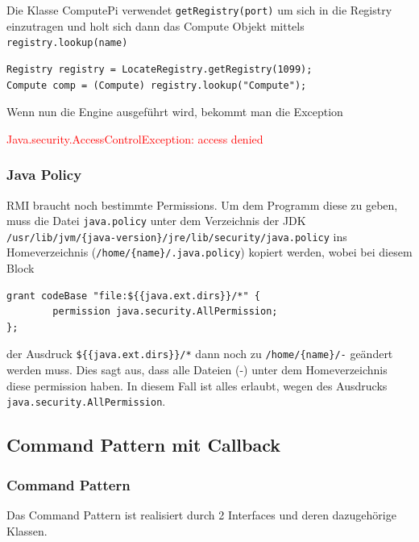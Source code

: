 Die Klasse ComputePi verwendet \texttt{getRegistry(port)} um sich in die Registry
einzutragen und holt sich dann das Compute Objekt mittels \texttt{registry.lookup(name)}

\begin{lstlisting}[style=Java, caption=Compute]
Registry registry = LocateRegistry.getRegistry(1099);
Compute comp = (Compute) registry.lookup("Compute");
\end{lstlisting}

Wenn nun die Engine ausgef\"uhrt wird, bekommt man die Exception

\textcolor{red}{Java.security.AccessControlException: access denied}

\clearpage

\subsubsection{Java Policy}

RMI braucht noch bestimmte Permissions. Um dem Programm diese zu geben, muss die Datei \texttt{java.policy} unter dem Verzeichnis der JDK \texttt{/usr/lib/jvm/\{java-version\}/jre/lib/security/java.policy} ins Homeverzeichnis (\texttt{/home/\{name\}/.java.policy}) kopiert werden, wobei bei diesem Block\\

\begin{lstlisting}[caption=java.policy]
grant codeBase "file:${{java.ext.dirs}}/*" {
        permission java.security.AllPermission;
};
\end{lstlisting}

der Ausdruck \texttt{\$\{\{java.ext.dirs\}\}/*} dann noch zu \texttt{/home/\{name\}/-} ge\"andert werden muss. Dies sagt aus, dass alle Dateien (-) unter dem Homeverzeichnis diese permission haben. In diesem Fall ist alles erlaubt, wegen des Ausdrucks \texttt{java.security.AllPermission}.

\clearpage

\subsection{Command Pattern mit Callback}

\subsubsection{Command Pattern}

Das Command Pattern ist realisiert durch 2 Interfaces und deren dazugeh\"orige Klassen.

